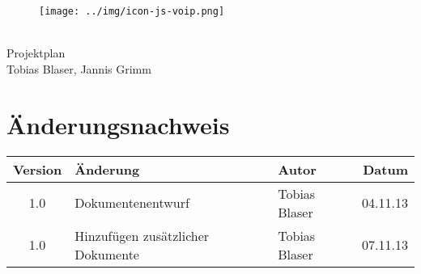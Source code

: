 

\providecommand{\documentType}{Projektplan}
\providecommand{\versionnumber}{1.0}



\thispagestyle{empty}
\begin{titlepage}
	\begin{center}

	\vspace*{40mm}
	
	\begin{figure}[htp]
		\centering
		\texttt{[image: ../img/icon-js-voip.png]}
	\end{figure}		
	\vspace*{20mm}
	
	{\fontsize{40}{48} \selectfont \project \\[10mm]}
	{\fontsize{40}{48} \selectfont \documentType \\[5mm]}	
	\vspace*{20mm}
	Tobias Blaser, Jannis Grimm

\end{center}
\end{titlepage}
\clearpage

\chapter*{Änderungsnachweis}
\begin{tabularx}{\textwidth}{|cXlr|} %
		\hline
		\textbf{Version} & \textbf{Änderung} & \textbf{Autor} & \textbf{Datum}\\
		\hline
		1.0 & Dokumentenentwurf & Tobias Blaser & 04.11.13\\
		1.0 & Hinzufügen zusätzlicher Dokumente & Tobias Blaser & 07.11.13\\
		\hline
\end{tabularx}

\tableofcontents











